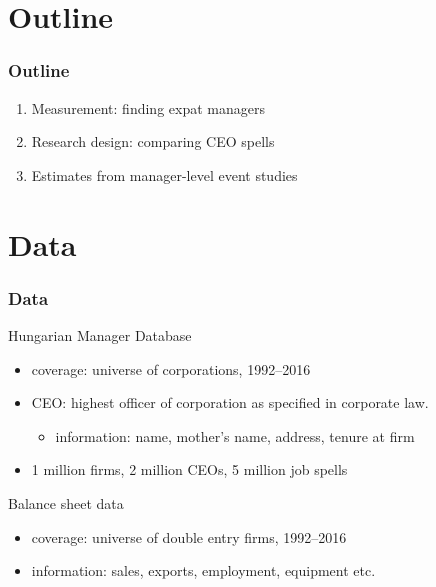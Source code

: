 \documentclass[aspectratio=169,compress,mathserif]{beamer}
\newcounter{ora}
\begin{document}
\section{Outline}\hypertarget{Outline}{}
\begin{frame}\frametitle{Outline}\hypertarget{Outline}{}
\begin{enumerate}\setcounter{enumi}{0}
\item Measurement: finding expat managers

\item Research design: comparing CEO spells

\item Estimates from manager-level event studies


\end{enumerate}
\end{frame}







\section{Data}\hypertarget{Data}{}


\begin{frame}\frametitle{Data}\hypertarget{Data}{}
\begin{block}{Hungarian Manager Database}\hypertarget{Hungarian Manager Database}{}
\begin{itemize}
\item coverage: universe of corporations, 1992--2016

\item CEO: highest officer of corporation as specified in corporate law.
\begin{itemize}
\item information: name, mother's name, address, tenure at firm
\end{itemize}

\item 1 million firms, 2 million CEOs, 5 million job spells


\end{itemize}
\end{block}
\begin{block}{Balance sheet data}\hypertarget{Balance sheet data}{}
\begin{itemize}
\item coverage: universe of double entry firms, 1992--2016

\item information: sales, exports, employment, equipment etc.


\end{itemize}
\end{block}
\end{frame}
\end{document}
